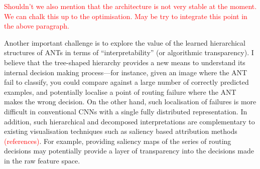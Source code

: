 \textcolor{red}{Shouldn't we also mention that the architecture is not very stable at the moment. We can chalk this up to the optimisation. May be try to integrate this point in the above paragraph. }


Another important challenge is to explore the value of the learned hierarchical structures of ANTs  in terms of “interpretability” (or algorithmic transparency). I believe that the tree-shaped hierarchy provides a new means to understand its internal decision making process---for instance, given an image where the ANT fail to classify, you could compare against a large number of correctly predicted examples, and potentially localise a point of routing failure where the ANT makes the wrong decision. On the other hand, such localisation of failures is more difficult in conventional CNNs with a single fully distributed representation. In addition, such hierarchical and decomposed interpretations are complementary to existing visualisation techniques such as saliency based attribution methods \textcolor{red}{(references)}. For example, providing saliency maps of the series of routing decisions may potentially provide a layer of transparency into the decisions made in the raw feature space. 



